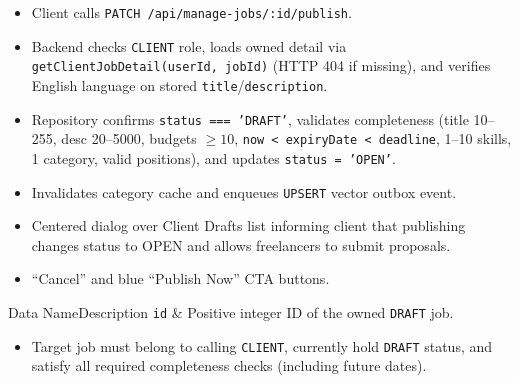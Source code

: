 \begin{itemize}[leftmargin=1.6em,topsep=3pt,itemsep=2pt,parsep=0pt,label=$\bullet$]
    \item Client calls \texttt{PATCH /api/manage-jobs/:id/publish}.
    \item Backend checks \texttt{CLIENT} role, loads owned detail via \texttt{getClientJobDetail(userId, jobId)} (HTTP 404 if missing), and verifies English language on stored \texttt{title}/\texttt{description}.
    \item Repository confirms \texttt{status === 'DRAFT'}, validates completeness (title 10--255, desc 20--5000, budgets $\ge 10$, \texttt{now < expiryDate < deadline}, 1--10 skills, 1 category, valid positions), and updates \texttt{status = 'OPEN'}.
    \item Invalidates category cache and enqueues \texttt{UPSERT} vector outbox event.
\end{itemize}

\begin{itemize}[leftmargin=1.6em,topsep=3pt,itemsep=2pt,parsep=0pt,label=$\bullet$]
    \item Centered dialog over Client Drafts list informing client that publishing changes status to OPEN and allows freelancers to submit proposals.
    \item ``Cancel'' and blue ``Publish Now'' CTA buttons.
\end{itemize}


\begin{specdatatable}{Data Name}{Description}
\texttt{id} & Positive integer ID of the owned \texttt{DRAFT} job.\\ \hline
\end{specdatatable}

\begin{itemize}[leftmargin=1.6em,topsep=3pt,itemsep=2pt,parsep=0pt,label=$\bullet$]
    \item Target job must belong to calling \texttt{CLIENT}, currently hold \texttt{DRAFT} status, and satisfy all required completeness checks (including future dates).
\end{itemize}

